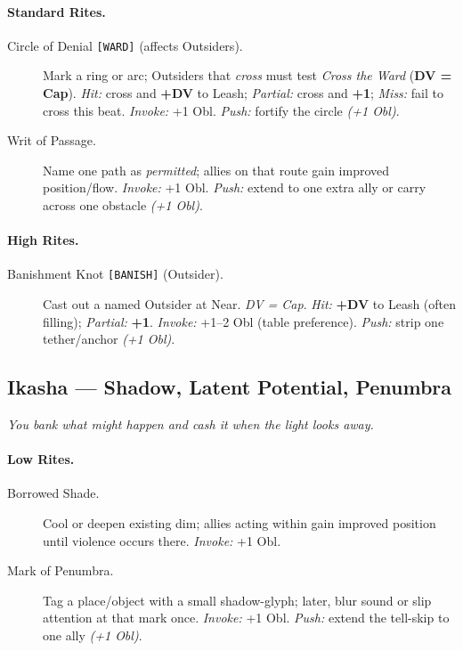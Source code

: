 \paragraph{Standard Rites.}
\begin{description}
  \item[Circle of Denial \texttt{[WARD]} (affects Outsiders).] Mark a ring or arc; Outsiders that \emph{cross} must test \emph{Cross the Ward} (\textbf{DV = Cap}). \emph{Hit:} cross and \textbf{+DV} to Leash; \emph{Partial:} cross and \textbf{+1}; \emph{Miss:} fail to cross this beat. \emph{Invoke:} +1 Obl. \emph{Push:} fortify the circle \emph{(+1 Obl)}.
  \item[Writ of Passage.] Name one path as \emph{permitted}; allies on that route gain improved position/flow. \emph{Invoke:} +1 Obl. \emph{Push:} extend to one extra ally or carry across one obstacle \emph{(+1 Obl)}.
\end{description}

\paragraph{High Rites.}
\begin{description}
  \item[Banishment Knot \texttt{[BANISH]} (Outsider).] Cast out a named Outsider at Near. \emph{DV = Cap}. \emph{Hit:} \textbf{+DV} to Leash (often filling); \emph{Partial:} \textbf{+1}. \emph{Invoke:} +1--2 Obl (table preference). \emph{Push:} strip one tether/anchor \emph{(+1 Obl)}.
\end{description}

\subsection{Ikasha — Shadow, Latent Potential, Penumbra}
\textit{You bank what might happen and cash it when the light looks away.}

\paragraph{Low Rites.}
\begin{description}
  \item[Borrowed Shade.] Cool or deepen existing dim; allies acting within gain improved position until violence occurs there. \emph{Invoke:} +1 Obl.
  \item[Mark of Penumbra.] Tag a place/object with a small shadow-glyph; later, blur sound or slip attention at that mark once. \emph{Invoke:} +1 Obl. \emph{Push:} extend the tell-skip to one ally \emph{(+1 Obl)}.
\end{description}

